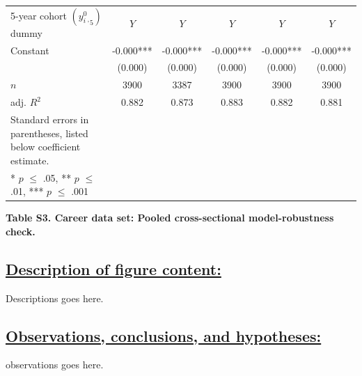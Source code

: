 \documentclass{article}\usepackage[]{graphicx}\usepackage[]{color}
\begin{document}
\begin{table}[h!]
\begin{center}
\begin{tabular}{l c c c c c}
    \rowcolor{gray!50} 
    5-year cohort $(y{^0_i{_,}}_{5})$ dummy & $\textit{Y}$ & $\textit{Y}$ & $\textit{Y}$ & $\textit{Y}$ & $\textit{Y}$ \\
    
    \rowcolor{gray!50} 
    Constant 
    & -0.000*** & -0.000***  & -0.000*** & -0.000*** & -0.000*** \\
    {} 
    & (0.000)   & (0.000)    & (0.000)   & (0.000)   & (0.000) \\
    
    \hline
    
    \rowcolor{gray!50} 
    $\textit{n}$
    & 3900 & 3387 & 3900 & 3900 & 3900 \\
    
    \rowcolor{gray!50} 
    adj. ${R^2}$ 
    & 0.882 & 0.873 & 0.883 & 0.882 & 0.881 \\
    
    \hline
    \hline
    
    Standard errors in parentheses, listed below coefficient estimate. \\
    {* $\textit{p}$ $\leq$ .05, ** $\textit{p}$ $\leq$ .01, *** $\textit{p}$ $\leq$ .001}
    
  \end{tabular}
  \end{center}
\end{table}
\begin{center}
\par{\textbf{Table S3. Career data set: Pooled cross-sectional model-robustness check.}}
\end{center}
\newpage
\subsection*{\underline{Description of figure content:}}
\par{
Descriptions goes here.
}
\subsection*{\underline{Observations, conclusions, and hypotheses:}}
\par{
observations goes here.
}
\end{document}

